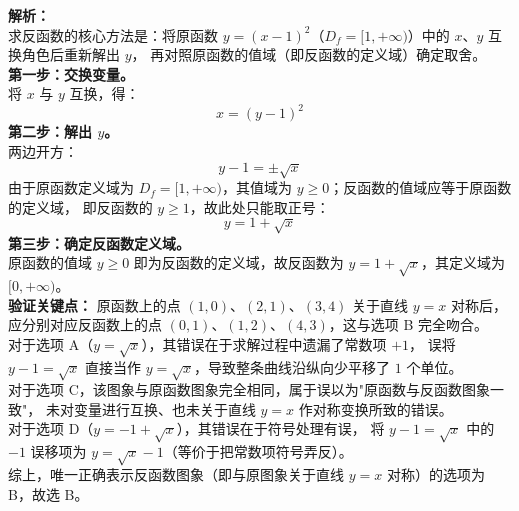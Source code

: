 \documentclass[12pt,a4paper]{exam-zh}
\begin{document}
\begin{solution}
    \textbf{解析：} \\
    求反函数的核心方法是：将原函数 $y = (x-1)^2$（$D_f = [1, +\infty)$）中的 $x$、$y$ 互换角色后重新解出 $y$，
    再对照原函数的值域（即反函数的定义域）确定取舍。 \\[4pt]
    \textbf{第一步：交换变量。} \\
    将 $x$ 与 $y$ 互换，得：
    \[ \displaystyle x = (y-1)^2 \]
    \textbf{第二步：解出 $y$。} \\
    两边开方：
    \[ \displaystyle y - 1 = \pm\sqrt{x} \]
    由于原函数定义域为 $D_f = [1, +\infty)$，其值域为 $y \geq 0$；反函数的值域应等于原函数的定义域，
    即反函数的 $y \geq 1$，故此处只能取正号：
    \[ \displaystyle y = 1 + \sqrt{x} \]
    \textbf{第三步：确定反函数定义域。} \\
    原函数的值域 $y \geq 0$ 即为反函数的定义域，故反函数为 $y = 1 + \sqrt{x}$，其定义域为 $[0, +\infty)$。 \\[4pt]
    \textbf{验证关键点：} 原函数上的点 $(1,0)$、$(2,1)$、$(3,4)$ 关于直线 $y=x$ 对称后，
    应分别对应反函数上的点 $(0,1)$、$(1,2)$、$(4,3)$，这与选项 B 完全吻合。 \\[4pt]
    对于选项 A（$y=\sqrt{x}$），其错误在于求解过程中遗漏了常数项 $+1$，
    误将 $y-1=\sqrt{x}$ 直接当作 $y=\sqrt{x}$，导致整条曲线沿纵向少平移了 $1$ 个单位。 \\
    对于选项 C，该图象与原函数图象完全相同，属于误以为"原函数与反函数图象一致"，
    未对变量进行互换、也未关于直线 $y=x$ 作对称变换所致的错误。 \\
    对于选项 D（$y=-1+\sqrt{x}$），其错误在于符号处理有误，
    将 $y-1=\sqrt{x}$ 中的 $-1$ 误移项为 $y=\sqrt{x}-1$（等价于把常数项符号弄反）。 \\[4pt]
    综上，唯一正确表示反函数图象（即与原图象关于直线 $y=x$ 对称）的选项为 B，故选 B。
\end{solution}

\newpage
\end{document}
